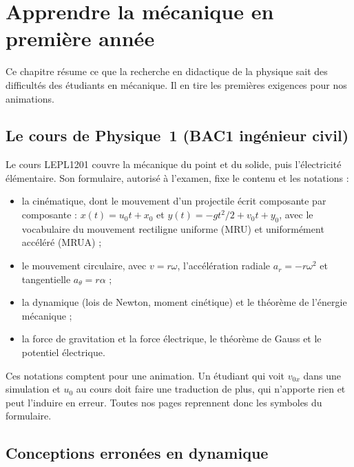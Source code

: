 
\chapter{Apprendre la mécanique en première année}\label{chap:mecanique}

Ce chapitre résume ce que la recherche en didactique de la physique sait des
difficultés des étudiants en mécanique. Il en tire les premières exigences
pour nos animations.

\section{Le cours de Physique~1 (BAC1 ingénieur civil)}

Le cours LEPL1201 couvre la mécanique du point et du solide, puis
l'électricité élémentaire. Son formulaire, autorisé à l'examen, fixe le
contenu et les notations \cite{formulaire_epl1201} :
\begin{itemize}
  \item la cinématique, dont le mouvement d'un projectile écrit composante
        par composante : \(x(t) = u_0 t + x_0\) et
        \(y(t) = -g t^2/2 + v_0 t + y_0\), avec le vocabulaire du mouvement
        rectiligne uniforme (MRU) et uniformément accéléré (MRUA) ;
  \item le mouvement circulaire, avec \(v = r \omega\), l'accélération
        radiale \(a_r = -r \omega^2\) et tangentielle \(a_\theta = r \alpha\) ;
  \item la dynamique (lois de Newton, moment cinétique) et le théorème de
        l'énergie mécanique ;
  \item la force de gravitation et la force électrique, le théorème de Gauss
        et le potentiel électrique.
\end{itemize}
Ces notations comptent pour une animation. Un étudiant qui voit \(v_{0x}\)
dans une simulation et \(u_0\) au cours doit faire une traduction de plus,
qui n'apporte rien et peut l'induire en erreur. Toutes nos pages reprennent
donc les symboles du formulaire.

\section{Conceptions erronées en dynamique}

